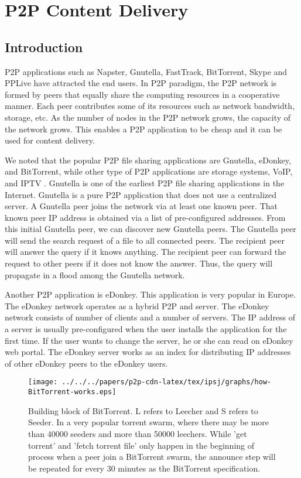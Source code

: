 \chapter{P2P Content Delivery}
\section{Introduction}

P2P applications such as Napster, Gnutella, FastTrack, BitTorrent, Skype and PPLive have attracted the end users.
In P2P paradigm, the P2P network is formed by peers that equally share the computing resources in a cooperative manner.
Each peer contributes some of its resources such as network bandwidth, storage, etc. 
As the number of nodes in the P2P network grows, the capacity of the network grows. 
This enables a P2P application to be cheap and it can be used for content delivery.  

We noted that the popular P2P file sharing applications are Gnutella, eDonkey, and BitTorrent, while other type of P2P applications are storage systems, VoIP, and IPTV \cite{5360707}.
Gnutella is one of the earliest P2P file sharing applications in the Internet.
Gnutella is a pure P2P application that does not use a centralized server.
A Gnutella peer joins the network via at least one known peer.
That known peer IP address is obtained via a list of pre-configured addresses. 
From this initial Gnutella peer, we can discover new Gnutella peers.
The Gnutella peer will send the search request of a file to all connected peers. 
The recipient peer will answer the query if it knows anything. 
The recipient peer can forward the request to other peers if it does not know the answer.
Thus, the query will propagate in a flood among the Gnutella network.

Another P2P application is eDonkey.  
This application is very popular in Europe. 
The eDonkey network operates as a hybrid P2P and server. 
The eDonkey network consists of number of  clients and a number of servers. 
The IP address of a server is usually pre-configured when the user installs the application for the first time.  
If the user wants to change the server, he or she can read on eDonkey web portal.
The eDonkey server works as an index for distributing IP addresses of other eDonkey peers to the eDonkey users.

\begin{figure}[tb]
\begin{center}
\texttt{[image: ../../../papers/p2p-cdn-latex/tex/ipsj/graphs/how-BitTorrent-works.eps]}
\end{center}
\caption{Building block of BitTorrent. 
L refers to Leecher and S refers to Seeder. 
In a very popular torrent swarm, where there may be more than 40000 seeders and more than 50000 leechers.
While 'get torrent' and 'fetch torrent file' only happen in the beginning of process when a peer join a BitTorrent swarm, the announce step will be repeated for every 30 minutes as the  BitTorrent specification.} 
\label{fig:bittorrentblock}
\end{figure}

